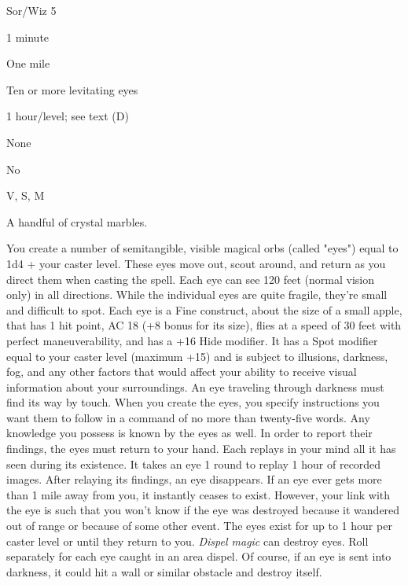 
\begin{description*}
\item[Level:] Sor/Wiz 5
\item[Casting Time:] 1 minute
\item[Range:] One mile
\item[Effect:] Ten or more levitating eyes
\item[Duration:] 1 hour/level; see text (D)
\item[Saving Throw:] None
\item[Spell Resistance:] No
\item[Components:] V, S, M
\item[Arcane Material Component:] A handful of crystal marbles.
\end{description*}

You create a number of semitangible, visible magical orbs (called "eyes") equal
to 1d4 + your caster level. These eyes move out, scout around, and return as you
direct them when casting the spell. Each eye can see 120 feet (normal vision only)
in all directions.
While the individual eyes are quite fragile, they're small and difficult to spot.
Each eye is a Fine construct, about the size of a small apple, that has 1 hit point,
AC 18 (+8 bonus for its size), flies at a speed of 30 feet with perfect maneuverability,
and has a +16 Hide modifier. It has a Spot modifier equal to your caster level
(maximum +15) and is subject to illusions, darkness, fog, and any other factors
that would affect your ability to receive visual information about your surroundings.
An eye traveling through darkness must find its way by touch.
When you create the eyes, you specify instructions you want them to follow in a
command of no more than twenty-five words. Any knowledge you possess is known by
the eyes as well.
In order to report their findings, the eyes must return to your hand. Each replays
in your mind all it has seen during its existence. It takes an eye 1 round to replay
1 hour of recorded images. After relaying its findings, an eye disappears.
If an eye ever gets more than 1 mile away from you, it instantly ceases to exist.
However, your link with the eye is such that you won't know if the eye was destroyed
because it wandered out of range or because of some other event.
The eyes exist for up to 1 hour per caster level or until they return to you. \textit{Dispel
magic} can destroy eyes. Roll separately for each eye caught in an area dispel.
Of course, if an eye is sent into darkness, it could hit a wall or similar obstacle
and destroy itself.
